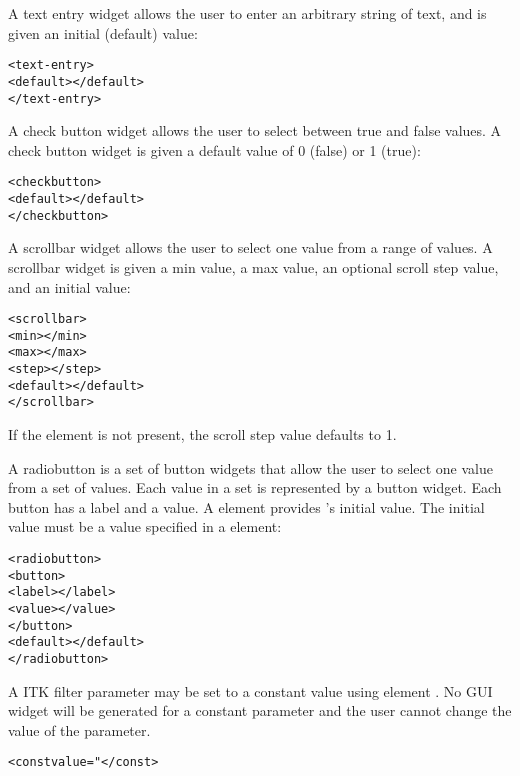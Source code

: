 A text entry widget allows the user to enter an arbitrary string of text,
and is given an initial (default) value:

\begin{alltt}
  <text-entry>
    <default></default>
  </text-entry>
\end{alltt}

A check button widget allows the user to select between true and false
values.  A check button widget is given a default value of 0 (false)
or 1 (true):

\begin{alltt}
  <checkbutton>
    <default></default>
  </checkbutton>
\end{alltt}

A scrollbar widget allows the user to select one value from a
range of values.  A scrollbar widget is given a min value, a max
value, an optional scroll step value, and an initial value:

\begin{alltt}
  <scrollbar>
    <min></min>
    <max></max>
    <step></step>
    <default></default>
  </scrollbar>
\end{alltt}

If the  element is not present, the scroll step value
defaults to 1.

A radiobutton is a set of button widgets that allow the user to select
one value from a set of values.  Each value in a set is represented
by a button widget.  Each button has a label and a value.  A
 element provides 's
initial value.  The initial value must be a value specified in a
 element:

\begin{alltt}
  <radiobutton>
    <button>
      <label></label>
      <value></value>
    </button>
    \velide  
    <default></default>
  </radiobutton>
\end{alltt}

A ITK filter parameter may be set to a constant value using element
.  No GUI widget will be generated for a constant
parameter and the user cannot change the value of the parameter.

\begin{alltt}
  <const value="</const>
\end{alltt}


